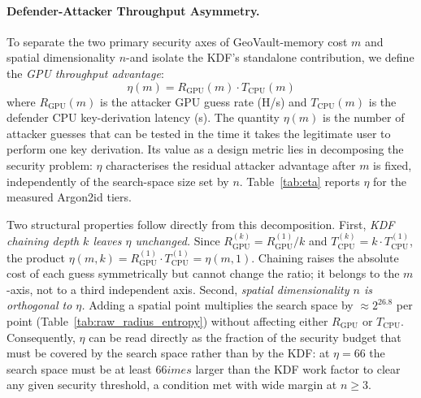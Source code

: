 \documentclass[journal,article,submit,pdftex,moreauthors]{Definitions/mdpi}
\newcommand{\add}[1]{#1}
\newcommand{\add}[1]{\added{#1}}
\begin{document}
\paragraph{\add{Defender-Attacker Throughput Asymmetry.}}
\add{To separate the two primary security axes of GeoVault-memory cost $m$ and spatial dimensionality $n$-and isolate the KDF's standalone contribution, we define the \emph{GPU throughput advantage}:
\begin{equation}
    \eta(m) = R_\text{GPU}(m) \cdot T_\text{CPU}(m)
    \label{eq:eta}
\end{equation}
where $R_\text{GPU}(m)$ is the attacker GPU guess rate (H/s) and $T_\text{CPU}(m)$ is the defender CPU key-derivation latency (s). The quantity $\eta(m)$ is the number of attacker guesses that can be tested in the time it takes the legitimate user to perform one key derivation. Its value as a design metric lies in decomposing the security problem: $\eta$ characterises the residual attacker advantage after $m$ is fixed, independently of the search-space size set by $n$. Table~\ref{tab:eta} reports $\eta$ for the measured Argon2id tiers.

Two structural properties follow directly from this decomposition.
First, \emph{KDF chaining depth $k$ leaves $\eta$ unchanged.} Since $R_\text{GPU}^{(k)} = R_\text{GPU}^{(1)}/k$ and $T_\text{CPU}^{(k)} = k\cdot T_\text{CPU}^{(1)}$, the product $\eta(m,k) = R_\text{GPU}^{(1)}\cdot T_\text{CPU}^{(1)} = \eta(m,1)$. Chaining raises the absolute cost of each guess symmetrically but cannot change the ratio; it belongs to the $m$-axis, not to a third independent axis.
Second, \emph{spatial dimensionality $n$ is orthogonal to $\eta$.} Adding a spatial point multiplies the search space by $\approx\!2^{26.8}$ per point (Table~\ref{tab:raw_radius_entropy}) without affecting either $R_\text{GPU}$ or $T_\text{CPU}$. Consequently, $\eta$ can be read directly as the fraction of the security budget that must be covered by the search space rather than by the KDF: at $\eta = 66$ the search space must be at least $66	imes$ larger than the KDF work factor to clear any given security threshold, a condition met with wide margin at $n \geq 3$.}
\end{document}
